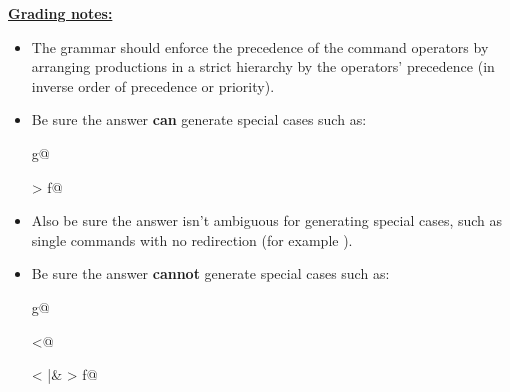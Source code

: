 \documentclass[11pt,fleqn]{article}
\begin{document}
\begin{enumerate}
\begin{info}{\textbf{\underline{Grading notes:}}}
\begin{itemize}
              \item The grammar should enforce the precedence of the command
                    operators by arranging productions in a strict hierarchy
                    by the operators' precedence (in inverse order of
                    precedence or priority).

                    \enlargethispage{5mm}

              \item Be sure the answer \textbf{can} generate special cases
                    such as:

                    \vspace{-3mm}

                    \begin{multicols}{4}

                      \centering

                       g@

                      \columnbreak

                      \verb@a > f@

                      \columnbreak

                      \verb@a@

                    \end{multicols}

                    \vspace{-3mm}

              \item Also be sure the answer isn't ambiguous for generating
                    special cases, such as single commands with no redirection
                    (for example \verb@a@).

              \item Be sure the answer \textbf{cannot} generate special cases
                    such as:

                    \vspace{-3mm}

                    \begin{multicols}{4}

                      \centering

                      \verb@a < > g@

                      \verb@a <@

                      \columnbreak

                      \verb@a < |& > f@


\end{multicols}
\end{itemize}
\end{info}
\end{enumerate}
\end{document}
